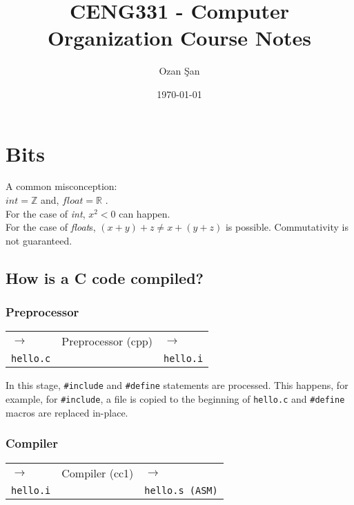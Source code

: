 \documentclass{article}
\title{CENG331 - Computer Organization Course Notes}
\author{Ozan Şan}
\date{\today}
\begin{document}
\maketitle

\section{Bits}

A common misconception: \\
$int = \mathbb{Z}$ and, $float = \mathbb{R}$ .\\

For the case of \textit{int}, $x^{2} < 0$ can happen. \\

For the case of \textit{float}s, $(x+y)+z \neq x+(y+z)$ is possible. Commutativity is not guaranteed.

\subsection{How is a C code compiled?}

\subsubsection{Preprocessor}
\begin{table}[ht!]
\centering
\begin{tabular}{lll}
\cline{2-2}
\multicolumn{1}{l|}{$\rightarrow$} & \multicolumn{1}{l|}{Preprocessor (cpp)} & $\rightarrow$       \\ \cline{2-2}
\texttt{hello.c}                &                        & \texttt{hello.i}
\end{tabular}
\end{table}

In this stage, \texttt{\#include} and \texttt{\#define} statements are processed. This happens, for example, for \texttt{\#include}, a file is copied to the beginning of \texttt{hello.c} and \texttt{\#define} macros are replaced in-place.


\subsubsection{Compiler}
\begin{table}[ht!]
\centering
\begin{tabular}{lll}
\cline{2-2}
\multicolumn{1}{l|}{$\rightarrow$} & \multicolumn{1}{l|}{Compiler (cc1)} & $\rightarrow$       \\ \cline{2-2}
\texttt{hello.i}               &                        & \texttt{hello.s (ASM)}
\end{tabular}
\end{table}
\end{document}
